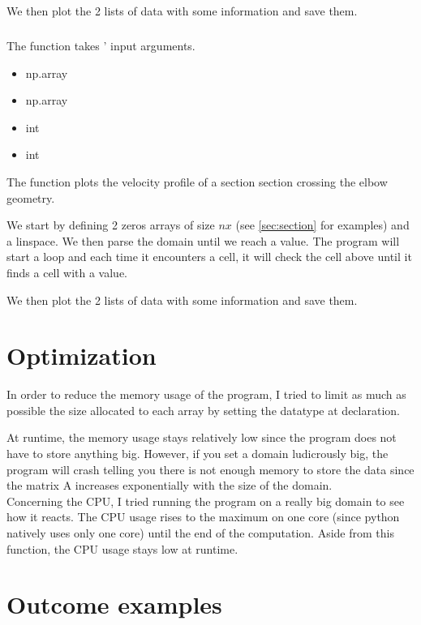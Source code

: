 We then plot the 2 lists of data with some information and save them.

\subsubsection{}
The function \textcolor{func}{} takes ' input arguments.
\begin{itemize}
      \item {} \textcolor{dtype}{np.array}
      \item {} \textcolor{dtype}{np.array}
      \item {} \textcolor{dtype}{int}
      \item {} \textcolor{dtype}{int}
\end{itemize}
The function plots the velocity profile of a section section crossing the elbow
geometry.

We start by defining 2 zeros arrays of size $nx$ (see
\autoref{sec:section} for examples) and a linspace. We then parse the domain
until we reach a  value. The program will start a loop and each time
it encounters a  cell, it will check the cell above until it finds
a cell with a  value.

We then plot the 2 lists of data with some information and save them.

\newpage
\part{Optimization}
In order to reduce the memory usage of the program, I tried to limit as much
as possible the size allocated to each array by setting the datatype at
declaration.

At runtime, the memory usage stays relatively low since the program does not
have to store anything big. However, if you set a domain ludicrously big,
the program will crash telling you there is not enough memory to store the data
since the matrix A increases exponentially with the size of the domain.\\
Concerning the CPU, I tried running the program on a really big domain to see
how it reacts. The CPU usage rises to the maximum on one core (since python
natively uses only one core) until the end of the 
computation. Aside from this function, the CPU usage stays low at runtime.

\newpage
\part{Outcome examples}
